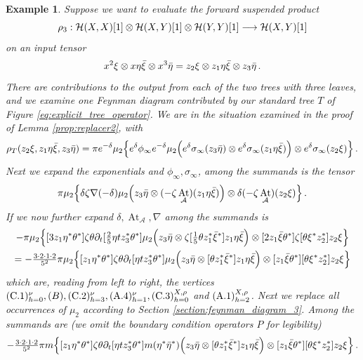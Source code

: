 \documentclass[english,letter paper,12pt,leqno]{article}
\theoremstyle{example}
\newtheorem{example}[theorem]{Example}
\numberwithin{equation}{section}
\def\AA{\mathcal{A}}
\def\HH{\HH}
\def\HH{\mathcal{H}}
\DeclareMathOperator{\vAt}{At}
\begin{document}
\begin{example}
Suppose we want to evaluate the forward suspended product
\[
\rho_3: \HH(X,X)[1] \otimes \HH(X,Y)[1] \otimes \HH(Y,Y)[1] \lto \HH(X,Y)[1]
\]
on an input tensor
\[
x^2 \xi \otimes x \eta \Bar{\xi} \otimes x^3 \Bar{\eta} = z_2 \xi \otimes z_1 \eta \Bar{\xi} \otimes z_3 \Bar{\eta}\,.
\]
There are contributions to the output from each of the two trees with three leaves, and we examine one Feynman diagram contributed by our standard tree $T$ of Figure \ref{eq:explicit_tree_operator}. We are in the situation examined in the proof of Lemma \ref{prop:replacer2}, with
\[
\rho_T( z_2 \xi, z_1 \eta \Bar{\xi}, z_3 \Bar{\eta} ) = \pi e^{-\delta} \mu_2\Big\{ e^{\delta} \phi_\infty e^{-\delta} \mu_2\Big( e^\delta \sigma_\infty( z_3 \Bar{\eta} ) \otimes e^\delta \sigma_\infty( z_1 \eta \Bar{\xi} ) \Big) \otimes e^\delta\sigma_\infty( z_2 \xi ) \Big\}\,.
\]
Next we expand the exponentials and $\phi_\infty, \sigma_\infty$, among the summands is the tensor
\begin{align*}
\pi \mu_2\Big\{ \delta \zeta \nabla (-\delta) \mu_2\Big( z_3 \Bar{\eta} \otimes (-\zeta \vAt_{\AA})( z_1\eta \Bar{\xi} ) \Big) \otimes \delta (-\zeta \vAt_{\AA})( z_2 \xi ) \Big\}\,.
\end{align*}
If we now further expand $\delta, \vAt_{\AA}, \nabla$ among the summands is
\begin{gather*}
- \pi \mu_2\Big\{ [ 3 z_1 \eta^* \theta^* ] \zeta \theta \partial_t [ \tfrac{2}{5} \eta t z_3^* \theta^* ] \mu_2\Big( z_3 \Bar{\eta} \otimes \zeta [\tfrac{1}{5} \theta z_1^* \Bar{\xi}^*] z_1 \eta \Bar{\xi}\Big) \otimes [2z_1 \Bar{\xi} \theta^*] \zeta [\theta \xi^* z_2^*] z_2 \xi \Big\}\\
= - \tfrac{3 \cdot 2 \cdot 1 \cdot 2}{5^2} \pi \mu_2\Big\{ [ z_1 \eta^* \theta^* ] \zeta \theta \partial_t [ \eta t z_3^* \theta^* ] \mu_2\Big( z_3 \Bar{\eta} \otimes [ \theta z_1^* \Bar{\xi}^*] z_1 \eta \Bar{\xi}\Big) \otimes [z_1 \Bar{\xi} \theta^*] [\theta \xi^* z_2^*] z_2 \xi \Big\}
\end{gather*}
which are, reading from left to right, the vertices $(\textup{C}.1)^\nu_{h=0}, (B), (\textup{C}.2)^{\nu}_{h=3}, (\textup{A}.4)^\nu_{h=1}, (\textup{C}.3)^{X,\rho}_{h=0}$ and $(\textup{A}.1)^{X,\rho}_{h=2}$. Next we replace all occurrences of $\mu_2$ according to Section \ref{section:feynman_diagram_3}. Among the summands are (we omit the boundary condition operators $P$ for legibility)
\begin{gather*}
- \tfrac{3 \cdot 2 \cdot 1 \cdot 2}{5^2} \pi m\Big\{ [ z_1 \eta^* \theta^* ] \zeta \theta \partial_t [ \eta t z_3^* \theta^* ] m ( \eta^* \Bar{\eta}^* ) \Big( z_3 \Bar{\eta} \otimes [ \theta z_1^* \Bar{\xi}^*] z_1 \eta \Bar{\xi}\Big) \otimes [z_1 \Bar{\xi} \theta^*] [\theta \xi^* z_2^*] z_2 \xi \Big\}\,.

\end{gather*}
\end{example}
\end{document}
